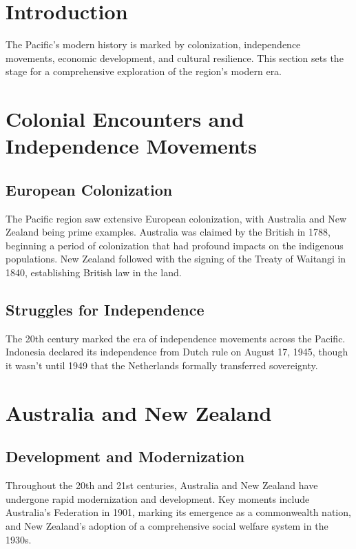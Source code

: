 \documentclass{book}
\begin{document}
\section{Introduction}
\label{sec:introduction-modern-pacific}
The Pacific's modern history is marked by colonization, independence movements, economic development, and cultural resilience. This section sets the stage for a comprehensive exploration of the region’s modern era.

\section{Colonial Encounters and Independence Movements}
\label{sec:colonial-independence}

\subsection{European Colonization}
\label{subsec:european-colonization}
The Pacific region saw extensive European colonization, with Australia and New Zealand being prime examples. Australia was claimed by the British in 1788, beginning a period of colonization that had profound impacts on the indigenous populations. New Zealand followed with the signing of the Treaty of Waitangi in 1840, establishing British law in the land.

\subsection{Struggles for Independence}
\label{subsec:independence-movements}
The 20th century marked the era of independence movements across the Pacific. Indonesia declared its independence from Dutch rule on August 17, 1945, though it wasn’t until 1949 that the Netherlands formally transferred sovereignty.

\section{Australia and New Zealand}
\label{sec:australia-newzealand}

\subsection{Development and Modernization}
\label{subsec:development-modernization}
Throughout the 20th and 21st centuries, Australia and New Zealand have undergone rapid modernization and development. Key moments include Australia’s Federation in 1901, marking its emergence as a commonwealth nation, and New Zealand’s adoption of a comprehensive social welfare system in the 1930s.
\end{document}
